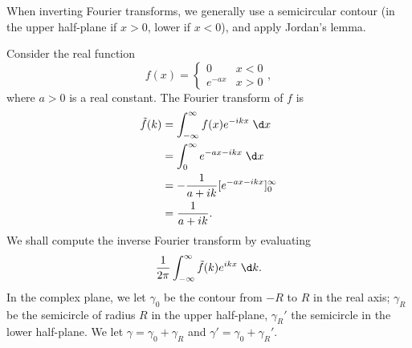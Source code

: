 \documentclass[a4paper]{article}
\begin{document}
When inverting Fourier transforms, we generally use a semicircular contour (in the upper half-plane if $x > 0$, lower if $x < 0$), and apply Jordan's lemma.
\begin{eg}
  Consider the real function
  \[
    f(x) =
    \begin{cases}
      0 & x < 0\\
      e^{-ax} & x > 0
    \end{cases},
  \]
  where $a > 0$ is a real constant. The Fourier transform of $f$ is
  \begin{align*}
    \tilde{f}(k) &= \int_{-\infty}^\infty f(x) e^{-ikx}\;\d x\\
    &= \int_0^\infty e^{-ax - ikx}\;\d x\\
    &= -\frac{1}{a + ik} [e^{-ax - ikx}]_0^\infty\\
    &= \frac{1}{a + ik}.
  \end{align*}
  We shall compute the inverse Fourier transform by evaluating
  \[
    \frac{1}{2\pi} \int_{-\infty}^\infty \tilde{f}(k) e^{ikx}\;\d k.
  \]
  In the complex plane, we let $\gamma_0$ be the contour from $-R$ to $R$ in the real axis; $\gamma_R$ be the semicircle of radius $R$ in the upper half-plane, $\gamma_R'$ the semicircle in the lower half-plane. We let $\gamma = \gamma_0 + \gamma_R$ and $\gamma' = \gamma_0 + \gamma_R'$.
  \begin{center}
\end{center}
\end{eg}
\end{document}
